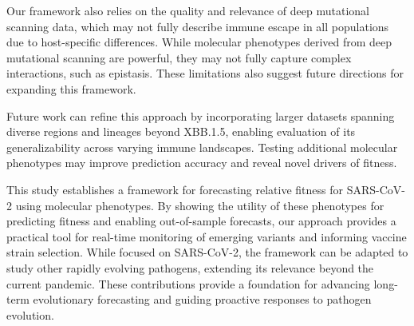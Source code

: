 Our framework also relies on the quality and relevance of deep mutational scanning data, which may not fully describe immune escape in all populations due to host-specific differences.
While molecular phenotypes derived from deep mutational scanning are powerful, they may not fully capture complex interactions, such as epistasis.
These limitations also suggest future directions for expanding this framework.

Future work can refine this approach by incorporating larger datasets spanning diverse regions and lineages beyond XBB.1.5, enabling evaluation of its generalizability across varying immune landscapes. Testing additional molecular phenotypes may improve prediction accuracy and reveal novel drivers of fitness.

This study establishes a framework for forecasting relative fitness for SARS-CoV-2 using molecular phenotypes.
By showing the utility of these phenotypes for predicting fitness and enabling out-of-sample forecasts, our approach provides a practical tool for real-time monitoring of emerging variants and informing vaccine strain selection. 
While focused on SARS-CoV-2, the framework can be adapted to study other rapidly evolving pathogens, extending its relevance beyond the current pandemic.
These contributions provide a foundation for advancing long-term evolutionary forecasting and guiding proactive responses to pathogen evolution.








